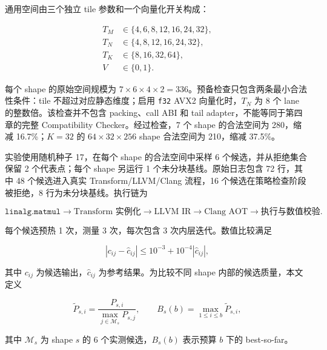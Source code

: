 通用空间由三个独立 tile 参数和一个向量化开关构成：

\begin{equation}
\begin{aligned}
T_M &\in \{4,6,8,12,16,24,32\},\\
T_N &\in \{4,8,12,16,24,32\},\\
T_K &\in \{8,16,32,64\},\\
V   &\in \{0,1\}.
\end{aligned}
\label{eq:chapter3-generic-domain}
\end{equation}

每个 shape 的原始空间规模为 $7\times6\times4\times2=336$。预备检查只包含两条最小合法性条件：tile 不超过对应静态维度；启用 \texttt{f32} AVX2 向量化时，$T_N$ 为 8 个 lane 的整数倍。该检查并不包含 packing、call ABI 和 tail adapter，不能等同于第四章的完整 Compatibility Checker。经过检查，7 个 shape 的合法空间为 280，缩减 16.7\%；$K=32$ 的 $64\times32\times256$ shape 合法空间为 210，缩减 37.5\%。

实验使用随机种子 17，在每个 shape 的合法空间中采样 6 个候选，并从拒绝集合保留 2 个代表点；每个 shape 另运行 1 个未分块基线。原始日志包含 72 行，其中 48 个候选进入真实 Transform/LLVM/Clang 流程，16 个候选在策略检查阶段被拒绝，8 行为未分块基线。执行链为

\begin{equation}
\texttt{linalg.matmul}
\rightarrow \text{Transform 实例化}
\rightarrow \text{LLVM IR}
\rightarrow \text{Clang AOT}
\rightarrow \text{执行与数值校验}.
\label{eq:chapter3-preliminary-pipeline}
\end{equation}

每个候选预热 1 次，测量 3 次，每次包含 3 次内层迭代。数值比较满足

\begin{equation}
\left|c_{ij}-\hat{c}_{ij}\right|
\leq 10^{-3}+10^{-4}\left|\hat{c}_{ij}\right|,
\label{eq:chapter3-correctness-tolerance}
\end{equation}

其中 $c_{ij}$ 为候选输出，$\hat{c}_{ij}$ 为参考结果。为比较不同 shape 内部的候选质量，本文定义

\begin{equation}
\widetilde{P}_{s,i}
=
\frac{P_{s,i}}{\max_{j\in\mathcal{M}_s}P_{s,j}},
\qquad
B_s(b)=\max_{1\leq i\leq b}\widetilde{P}_{s,i},
\label{eq:chapter3-preliminary-metrics}
\end{equation}

其中 $\mathcal{M}_s$ 为 shape $s$ 的 6 个实测候选，$B_s(b)$ 表示预算 $b$ 下的 best-so-far。


